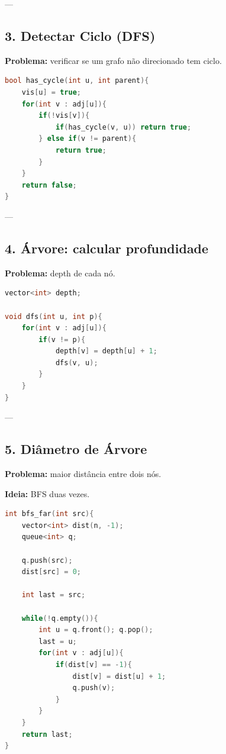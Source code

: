 \documentclass[11pt]{article}
\begin{document}
---

\subsection{3. Detectar Ciclo (DFS)}

\textbf{Problema:} verificar se um grafo não direcionado tem ciclo.

\begin{lstlisting}[language=C++]
bool has_cycle(int u, int parent){
    vis[u] = true;
    for(int v : adj[u]){
        if(!vis[v]){
            if(has_cycle(v, u)) return true;
        } else if(v != parent){
            return true;
        }
    }
    return false;
}
\end{lstlisting}

---

\subsection{4. Árvore: calcular profundidade}

\textbf{Problema:} depth de cada nó.

\begin{lstlisting}[language=C++]
vector<int> depth;

void dfs(int u, int p){
    for(int v : adj[u]){
        if(v != p){
            depth[v] = depth[u] + 1;
            dfs(v, u);
        }
    }
}
\end{lstlisting}

---

\subsection{5. Diâmetro de Árvore}

\textbf{Problema:} maior distância entre dois nós.

\textbf{Ideia:} BFS duas vezes.

\begin{lstlisting}[language=C++]
int bfs_far(int src){
    vector<int> dist(n, -1);
    queue<int> q;

    q.push(src);
    dist[src] = 0;

    int last = src;

    while(!q.empty()){
        int u = q.front(); q.pop();
        last = u;
        for(int v : adj[u]){
            if(dist[v] == -1){
                dist[v] = dist[u] + 1;
                q.push(v);
            }
        }
    }
    return last;
}
\end{lstlisting}
\end{document}
